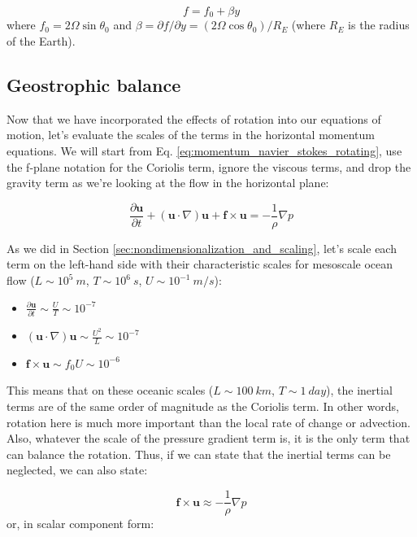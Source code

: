 \documentclass[12pt]{article}
\numberwithin{equation}{section}
\numberwithin{figure}{section}
\numberwithin{table}{section}
\begin{document}
\begin{equation}
f = f_0 + \beta y
\end{equation}
where $f_0 = 2\Omega \sin\theta_0$ and $\beta = \partial f/\partial y = (2\Omega\cos\theta_0) / R_E$
(where $R_E$ is the radius of the Earth).

\subsection{Geostrophic balance}
\label{sec:geostrophic_balance}

Now that we have incorporated the effects of rotation into our equations of motion,
let's evaluate the scales of the terms in the horizontal momentum equations.
We will start from Eq. \ref{eq:momentum_navier_stokes_rotating}, use the f-plane
notation for the Coriolis term, ignore the viscous terms, and drop the gravity
term as we're looking at the flow in the horizontal plane:

\begin{equation}
  \frac{\partial \mathbf{u}}{\partial t} +
  (\mathbf{u} \cdot \nabla) \mathbf{u} +
  \mathbf{f} \times \mathbf{u} =
  - \frac{1}{\rho} \nabla p
\end{equation}

As we did in Section \ref{sec:nondimensionalization_and_scaling}, let's scale
each term on the left-hand side with their characteristic scales for mesoscale
ocean flow ($L \sim 10^5\ m$, $T \sim 10^6\ s$, $U \sim 10^{-1}\ m/s$):

\begin{itemize}
  \item $\frac{\partial \mathbf{u}}{\partial t} \sim \frac{U}{T} \sim 10^{-7}$
  \item $(\mathbf{u} \cdot \nabla) \mathbf{u} \sim \frac{U^2}{L} \sim 10^{-7}$
  \item $\mathbf{f} \times \mathbf{u} \sim f_0 U \sim 10^{-6}$
\end{itemize}
This means that on these oceanic scales ($L \sim 100\ km$, $T \sim 1\ day$),
the inertial terms are of the same order of magnitude as the Coriolis term.
In other words, rotation here is much more important than the local rate of
change or advection.
Also, whatever the scale of the pressure gradient term is, it is the only
term that can balance the rotation.
Thus, if we can state that the inertial terms can be neglected, we can also
state:

\begin{equation}
  \mathbf{f} \times \mathbf{u} \approx - \frac{1}{\rho} \nabla p
\end{equation}
or, in scalar component form:
\end{document}
